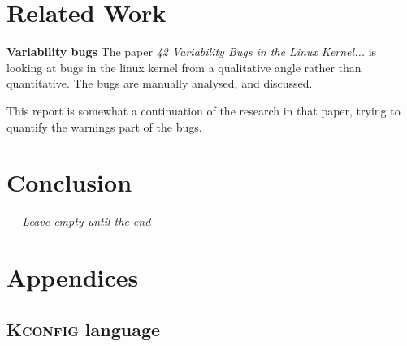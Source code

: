 \documentclass[a4paper,11pt]{report}
\begin{document}




\newpage
\chapter{Related Work}

\textbf{Variability bugs}
The paper \emph{42 Variability Bugs in the Linux Kernel...}\cite{42paper} is 
looking at bugs in the linux kernel from a qualitative angle rather than 
quantitative.  The bugs are manually analysed, and discussed.

This report is somewhat a continuation of the research in that paper, trying to 
quantify the warnings part of the bugs.

\newpage
\chapter{Conclusion}
\emph{--- Leave empty until the end---}




\newpage




            \newpage
            \chapter{Appendices}


            \section{\textsc{Kconfig} language}
            \label{app:kconfig}

            \def \fn {\url{http://www.lua.org/manual/5.1/manual.html}}
\end{document}
